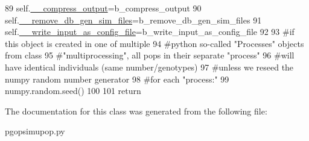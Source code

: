 \begin{DoxyCode}
89         self.\hyperlink{classnegui_1_1pgopsimupop_1_1PGOpSimuPop_acccf36393e66057c8026cba0557d3fb8}{\_\_compress\_output}=b\_compress\_output
90         self.\hyperlink{classnegui_1_1pgopsimupop_1_1PGOpSimuPop_a5a64b272404e6113dd1c7ba70235c366}{\_\_remove\_db\_gen\_sim\_files}=b\_remove\_db\_gen\_sim\_files
91         self.\hyperlink{classnegui_1_1pgopsimupop_1_1PGOpSimuPop_a9a27655cf00df0e11603e221c314c0a9}{\_\_write\_input\_as\_config\_file}=b\_write\_input\_as\_config\_file
92 
93         \textcolor{comment}{#if this object is created in one of multiple}
94         \textcolor{comment}{#python so-called "Processes" objects from class}
95         \textcolor{comment}{#"multiprocessing", all pops in their separate "process"}
96         \textcolor{comment}{#will have identical individuals (same number/genotypes) }
97         \textcolor{comment}{#unless we reseed the numpy random number generator }
98         \textcolor{comment}{#for each "process:"}
99         numpy.random.seed()
100         
101         \textcolor{keywordflow}{return}
\end{DoxyCode}


The documentation for this class was generated from the following file\+:\begin{DoxyCompactItemize}
\item 
pgopsimupop.\+py\end{DoxyCompactItemize}
